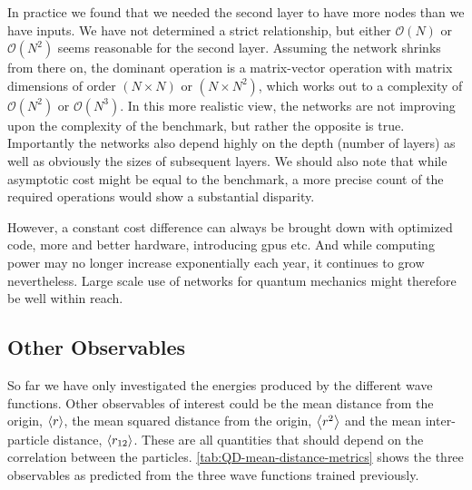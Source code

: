 \documentclass[Thesis.tex]{subfiles}
\begin{document}
In practice we found that we needed the second layer to have more
nodes than we have inputs. We have not determined a strict relationship, but
either $\mathcal{O}(N)$ or $\mathcal{O}(N^2)$ seems reasonable for the second
layer. Assuming the network shrinks from there on, the dominant operation is a
matrix-vector operation with matrix dimensions of order $(N\times N)$ or $(N\times N^2)$,
which works out to a complexity of $\mathcal{O}(N^2)$ or $\mathcal{O}(N^3)$. In
this more realistic view, the networks are not improving upon the complexity of
the benchmark, but rather the opposite is true.\\

Importantly the networks also depend highly on the depth (number of layers) as
well as obviously the sizes of subsequent layers. We should also note that while
asymptotic cost might be equal to the benchmark, a more precise count of the
required operations would show a substantial disparity.

However, a constant cost difference can always be brought down with optimized code, more
and better hardware, introducing \glspl{gpu} etc. And while computing power may no
longer increase exponentially each year, it continues to grow nevertheless.
Large scale use of networks for quantum mechanics might therefore be well
within reach.

\subsection{Other Observables}

So far we have only investigated the energies produced by the different wave
functions. Other observables of interest could be the mean distance from the origin,
$\expval{r}$, the mean squared distance from the origin, $\expval{r^2}$ and the mean
inter-particle distance, $\expval{r_{12}}$. These are all quantities that should
depend on the correlation between the particles.
\cref{tab:QD-mean-distance-metrics} shows the three observables as predicted
from the three wave functions trained previously.
\end{document}
